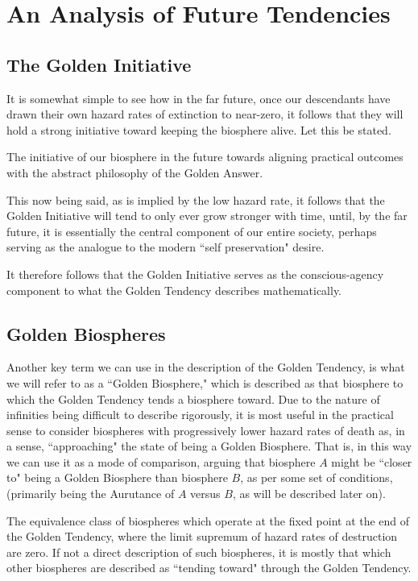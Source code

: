 \section{An Analysis of Future Tendencies}

\subsection{The Golden Initiative}

It is somewhat simple to see how in the far future, once our descendants have drawn their own hazard rates of extinction to near-zero, it follows that they will hold a strong initiative toward keeping the biosphere alive. Let this be stated. 
\begin{concept}
    The initiative of our biosphere in the future towards aligning practical outcomes with the abstract philosophy of the Golden Answer. 
\end{concept}
This now being said, as is implied by the low hazard rate, it follows that the Golden Initiative will tend to only ever grow stronger with time, until, by the far future, it is essentially the central component of our entire society, perhaps serving as the analogue to the modern ``self preservation" desire. 

It therefore follows that the Golden Initiative serves as the conscious-agency component to what the Golden Tendency describes mathematically.

\subsection{Golden Biospheres}

Another key term we can use in the description of the Golden Tendency, is what we will refer to as a ``Golden Biosphere," which is described as that biosphere to which the Golden Tendency tends a biosphere toward. Due to the nature of infinities being difficult to describe rigorously, it is most useful in the practical sense to consider biospheres with progressively lower hazard rates of death as, in a sense, ``approaching" the state of being a Golden Biosphere. That is, in this way we can use it as a mode of comparison, arguing that biosphere $A$ might be ``closer to" being a Golden Biosphere than biosphere $B$, as per some set of conditions, (primarily being the Aurutance of $A$ versus $B$, as will be described later on). 
\begin{concept}
    The equivalence class of biospheres which operate at the fixed point at the end of the Golden Tendency, where the limit supremum of hazard rates of destruction are zero. If not a direct description of such biospheres, it is mostly that which other biospheres are described as ``tending toward" through the Golden Tendency. 
\end{concept}


